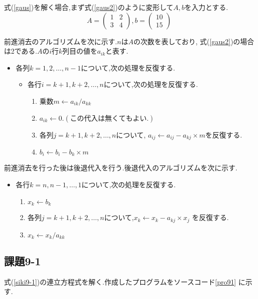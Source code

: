 \documentclass[a4j]{jsarticle}
\begin{document}
式(\ref{gaus})を解く場合,まず式(\ref{gaus2})のように変形して$A,b$を入力とする.
\begin{equation}
   A=\begin{pmatrix} 1 & 2 \\ 3 & 4 \end{pmatrix},b=\begin{pmatrix} 10 \\ 15 \end{pmatrix}
   \label{gaus2}
\end{equation}

前進消去のアルゴリズムを次に示す.$n$は$A$の次数を表しており,
式(\ref{gaus2})の場合は2である.$A$の$i$行$k$列目の値を$a_{ik}$と表す.
\begin{itemize}
 \item 各列$k=1,2,\ldots,n-1$について,次の処理を反復する.
       \begin{itemize}
	\item 各行$i=k+1,k+2,\ldots,n$について,次の処理を反復する.
	      \begin{enumerate}
	       \item{乗数$m \leftarrow a_{ik}/a_{kk}$}
	       \item $a_{ik} \leftarrow 0.(この代入は無くてもよい.)$
	       \item{各列$j=k+1,k+2,\ldots,n$について,
		    $a_{ij} \leftarrow a_{ij}-a_{kj}\times m$を反復する.}
	       \item{$b_i\leftarrow b_i - b_k \times m$}
	      \end{enumerate}
       \end{itemize}
\end{itemize}

前進消去を行った後は後退代入を行う.後退代入のアルゴリズムを次に示す.

\begin{itemize}
 \item 各行$k=n,n-1,\ldots,1$について,次の処理を反復する.
       \begin{enumerate}
	\item $x_k \leftarrow b_k$
	\item 各列$j=k+1,k+2,\ldots,n$について,$x_k \leftarrow x_k - a_{kj}\times x_j$
	      を反復する.
	\item $x_k\leftarrow x_k/a_{kk}$
       \end{enumerate}
\end{itemize}

\subsection{課題9-1}
式(\ref{siki9-1})の連立方程式を解く.作成したプログラムをソースコード\ref{pro91}
に示す.
\end{document}

